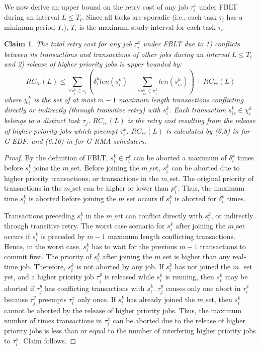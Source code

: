\documentclass[conference,letterpaper]{IEEEtran}
\newtheorem{clm}{Claim}
\begin{document}
We now derive an upper bound on the retry cost of any job $\tau_{i}^{x}$
under FBLT during an interval $L\le T_{i}$. Since all tasks are sporadic
(i.e., each task $\tau_{i}$ has a minimum period $T_{i}$), $T_{i}$
is the maximum study interval for each task $\tau_{i}$. 
%
\begin{clm}
The total retry cost for any job $\tau_{i}^{x}$ under FBLT due to 1) conflicts
between its transactions and transactions of other jobs during an interval $L\le T_{i}$ and 2) release of higher priority jobs is upper bounded by:
%
\begin{equation}
RC_{to}(L)\le\sum_{\forall s_{i}^{k}\in s_{i}}\left(\delta_{i}^{k}len(s_{i}^{k})+\sum_{\forall s_{iz}^k\in \chi_i^k} len(s_{iz}^{k})\right)+RC_{re}(L)\label{eq:fblt_rc}
\end{equation} 
where $\chi_i^k$ is the set of at most $m-1$ maximum length transactions conflicting directly or indirectly (through transitive retry) with $s_i^k$. Each transaction $s_{iz}^k \in \chi_i^k$ belongs to a distinct task $\tau_j$. $RC_{re}(L)$ is the retry cost resulting
from the release of higher priority jobs which preempt $\tau_{i}^{x}$.
$RC_{re}(L)$ is calculated by (6.8) in \cite{shambake_phd_proposal}
for G-EDF, and (6.10) in \cite{shambake_phd_proposal} for G-RMA schedulers.
%
\end{clm}
%
\begin{proof}
By the definition of FBLT, $s_{i}^{k}\in\tau_{i}^{x}$ can be aborted
a maximum of $\delta_{i}^{k}$ times before $s_{i}^{k}$ joins the $m\_$set. Before joining the $m\_$set, $s_{i}^{k}$ can be aborted due to higher priority transactions, or transactions
in the $m\_$set. The original priority of transactions in the $m\_$set can be higher or lower than
$p_{i}^{x}$. Thus, the maximum time $s_{i}^{k}$ is aborted before
joining the $m\_$set occurs if $s_{i}^{k}$ is aborted for $\delta_{i}^{k}$ times. 

Transactions preceding  $s_i^k$ in the $m\_$set can conflict directly with $s_i^k$, or indirectly through transitive retry. The worst case scenario for $s_{i}^{k}$ after joining the $m\_$set occurs if $s_{i}^{k}$ is preceded by $m-1$ maximum length conflicting transactions. Hence, in the worst case, $s_{i}^{k}$ has to wait for the previous $m-1$ transactions to commit first. The priority of $s_{i}^{k}$ after joining the $m\_$set is higher than any real-time job. Therefore, $s_{i}^{k}$ is not aborted
by any job. If $s_{i}^{k}$ has not joined the $m\_$ set yet, and a higher
priority job $\tau_{j}^{y}$ is released while $s_{i}^{k}$ is running,
then $s_{i}^{k}$ may be aborted if $\tau_{j}^{y}$ has conflicting
transactions with $s_{i}^{k}$. $\tau_{j}^{y}$ causes only one abort
in $\tau_{i}^{x}$ because $\tau_{j}^{y}$ preempts $\tau_{i}^{x}$
only once. If $s_{i}^{k}$ has already joined the $m\_$set, then $s_{i}^{k}$
cannot be aborted by the release of higher priority jobs. Thus, the maximum
number of times transactions in $\tau_{i}^{x}$ can be aborted due to the release
of higher priority jobs is less than or equal to the number of interfering
higher priority jobs to $\tau_{i}^{x}$. Claim follows.
\end{proof}
\end{document}

